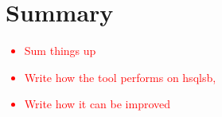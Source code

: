 \documentclass{uva-inf-article}
\newcommand\todo[1]{\textcolor{red}{#1}}
\begin{document}
\section{Summary}
\todo {
	\begin{itemize}
		\item{Sum things up}
		\item{Write how the tool performs on hsqlsb,}
		\item{Write how it can be improved}
	\end{itemize}
}




\printbibliography


\end{document}
